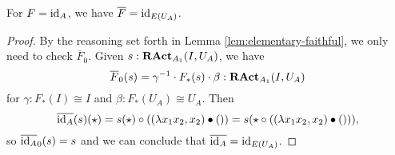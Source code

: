 \begin{remark}





\end{remark}

\begin{lemma}
  For $ F = \text{id}_{A} $, we have $ \overline F = \text{id}_{E(U_A)} $.
\end{lemma}
\begin{proof}
  By the reasoning set forth in Lemma \ref{lem:elementary-faithful}, we only need to check $ \overline F_0 $. Given $ s : \mathbf{RAct}_{A_1}(I, U_A) $, we have
  \[ \overline F_0(s) = \gamma^{-1} \cdot F_*(s) \cdot \beta: \mathbf{RAct}_{A_1}(I, U_A) \]
  for $ \gamma: F_*(I) \cong I $ and $ \beta: F_*(U_A) \cong U_A $. Then
  \[
    \overline{\text{id}_{A}}(s)(\star) = s(\star) \circ ((\lambda x_1 x_2, x_2) \bullet ()) = s(\star \circ ((\lambda x_1 x_2, x_2) \bullet ())),
  \]
  so $ \overline{\text{id}_{A}}_0(s) = s $ and we can conclude that $ \overline{\text{id}_{A}} = \text{id}_{E(U_A)} $.
\end{proof}

